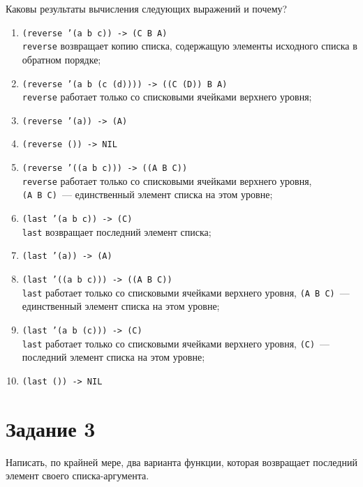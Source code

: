 Каковы результаты вычисления следующих выражений и почему?
\begin{enumerate}
	\item \texttt{(reverse '(a b c)) -> (C B A)}
	\\ \texttt{reverse} возвращает копию списка, содержащую элементы исходного списка в обратном порядке;
	
	\item \texttt{(reverse '(a b (c (d)))) -> ((C (D)) B A)}
	\\ \texttt{reverse} работает только со списковыми ячейками верхнего уровня;
	
	\item \texttt{(reverse '(a)) -> (A)}
	
	\item \texttt{(reverse ()) -> NIL}
	
	\item \texttt{(reverse '((a b c))) -> ((A B C))}
	\\ \texttt{reverse} работает только со списковыми ячейками верхнего уровня, \texttt{(A~B~C)}~--- единственный элемент списка на этом уровне;
	
	\item \texttt{(last '(a b c)) -> (C)}
	\\ \texttt{last} возвращает последний элемент списка;
	
	\item \texttt{(last '(a)) -> (A)}
	
	\item \texttt{(last '((a b c))) -> ((A B C))}
	\\ \texttt{last} работает только со списковыми ячейками верхнего уровня, \texttt{(A~B~C)}~--- единственный элемент списка на этом уровне;
	
	\item \texttt{(last '(a b (c))) -> (C)}
	\\ \texttt{last} работает только со списковыми ячейками верхнего уровня, \texttt{(C)}~--- последний элемент списка на этом уровне;
	
	\item \texttt{(last ()) -> NIL}
\end{enumerate}  

\section{Задание 3}

Написать, по крайней мере, два варианта функции, которая возвращает последний элемент своего списка-аргумента.

